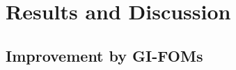 \documentclass[oribibl]{llncs}
\begin{document}
%
%
%
%
%
%


\section{Results and Discussion}
\label{sec_result}

\newcommand{\homss}{GI-HOMs-Sel}
\newcommand{\homsa}{GI-HOMs-All}


\subsection{Improvement by GI-FOMs}
\label{sec_resfom}
\end{document}
